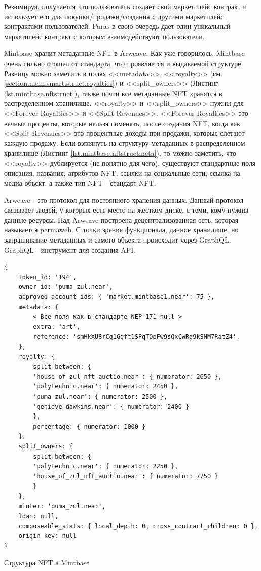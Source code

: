 Резюмируя, получается что пользователь создает свой маркетплейс контракт и использует его для покупки/продажи/создания с другими маркетплейс контрактами пользователей. Paras в свою очередь дает один уникальный маркетплейс контракт с которым взаимодействуют пользователи.

Mintbase хранит метаданные NFT в Arweave. Как уже говорилось, Mintbase очень сильно отошел от стандарта, что проявляется и выдаваемой структуре. Разницу можно заметить в полях <<metadata>>, <<royalty>> (см. {\color{blue} \ref{section.main.smart.struct.royalties}}) и <<split\_owners>> (Листинг {\color{blue} \ref{lst.mintbase.nftstruct}}), также почти все метаданные NFT хранятся в распределенном хранилище. <<royalty>> и <<split\_owners>> нужны для <<Forever Royalties>> и <<Split Revenues>>. <<Forever Royalties>> это вечные проценты, которые нельзя поменять, после создания NFT, когда как <<Split Revenues>> это процентные доходы при продажи, которые слетают каждую продажу. Если взглянуть на структуру метаданных в распределенном хранилище (Листинг {\color{blue} \ref{lst.mintbase.nftstructmeta}}), то можно заметить, что <<royalty>> дублируется (не понятно для чего), существуют стандартные поля описания, названия, атрибутов NFT, ссылки на социальные сети, ссылка на медиа-объект, а также тип NFT - стандарт NFT.

\begin{definition}
    Arweave\cite{arweave} - это протокол для постоянного хранения данных. Данный протокол связывает людей, у которых есть место на жестком диске, с теми, кому нужны данные ресурсы. Над Arweave построена децентрализованная сеть, которая называется permaweb\cite{permaweb}. С точки зрения функционала, данное хранилище, но запрашивание метаданных и самого объекта происходит через GraphQL\cite{graphql}. GraphQL - инструмент для создания API.
\end{definition}

\begin{listing}
\begin{verbatim}
{
    token_id: '194',
    owner_id: 'puma_zul.near',
    approved_account_ids: { 'market.mintbase1.near': 75 },
    metadata: {
        < Все поля как в стандарте NEP-171 null >
        extra: 'art',
        reference: 'smHkXU8rCq1Ggft1SPqTOpFw9sQxCwRg9kSNM7RatZ4',
    },
    royalty: {
        split_between: {
        'house_of_zul_nft_auctio.near': { numerator: 2650 },
        'polytechnic.near': { numerator: 2450 },
        'puma_zul.near': { numerator: 2500 },
        'genieve_dawkins.near': { numerator: 2400 }
        },
        percentage: { numerator: 1000 }
    },
    split_owners: {
        split_between: {
        'polytechnic.near': { numerator: 2250 },
        'house_of_zul_nft_auctio.near': { numerator: 7750 }
        }
    },
    minter: 'puma_zul.near',
    loan: null,
    composeable_stats: { local_depth: 0, cross_contract_children: 0 },
    origin_key: null
}

\end{verbatim}
\caption{Структура NFT в Mintbase}
\label{lst.mintbase.nftstruct}
\end{listing}

